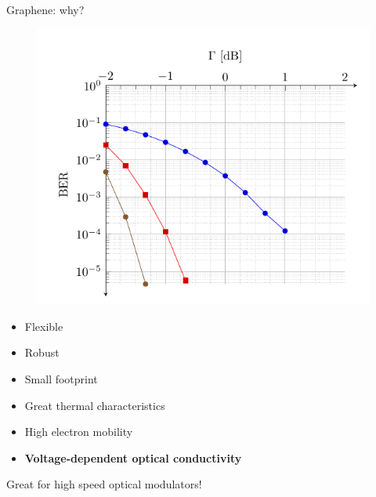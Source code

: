 \documentclass[handout,xcolor={usenames,dvipsnames},11pt]{beamer}
\begin{document}
\begin{frame}{Graphene: why?}
    \vspace{10pt}
    \begin{minipage}{0.6\textwidth}
        \begin{figure}
            \centering
            \includegraphics[width=\textwidth]{./images/BER}
        \end{figure}
    \end{minipage}\hfill
    \begin{minipage}{0.4\textwidth}
        \begin{itemize}
            \pause
            \item Flexible\pause
            \item Robust\pause
            \item Small footprint\pause
            \item Great thermal characteristics \pause
            \item \alert{High electron mobility}\pause
            \item \alert{\textbf{Voltage-dependent optical conductivity}}\pause
        \end{itemize}
    \end{minipage}
    \begin{center}
        \LARGE
        Great for high speed optical modulators!
    \end{center}
\end{frame}
\end{document}
